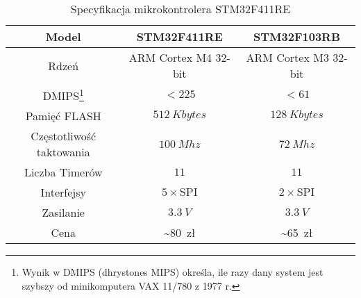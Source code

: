 \begin{table}
	[b]	\caption{Specyfikacja mikrokontrolera STM32F411RE}
	\label{tab:stm32_spec}
	\centering
	\begin{tabular}{|c|c|c|}
		\hline
		Model & STM32F411RE  & STM32F103RB \\ 
		\hline
		Rdzeń & ARM Cortex M4 32-bit & ARM Cortex M3 32-bit \\ 
		\hline
		DMIPS\footnote{Wynik w DMIPS (dhrystones MIPS) określa, ile razy dany system jest szybszy od minikomputera VAX 11/780 z 1977 r.} & $<225$ & $<61$ \\ 
		\hline
		Pamięć FLASH & $\SI{512}{Kbytes}$ & $\SI{128}{Kbytes}$ \\
		\hline
		Częstotliwość taktowania & $\SI{100}{Mhz}$ & $\SI{72}{Mhz}$ \\
		\hline
		Liczba Timerów &  $\num{11}$ &  $\num{11}$  \\
		\hline
		Interfejsy &  $5\times\mathrm{SPI}$ &  $2\times\mathrm{SPI}$\\
		\hline
		Zasilanie & $\SI{3.3}{V}$  & $\SI{3.3}{V}$\\
		\hline
		Cena & \SI{~80}{zł} & \SI{~65}{zł} \\
		\hline
	\end{tabular}
\end{table}